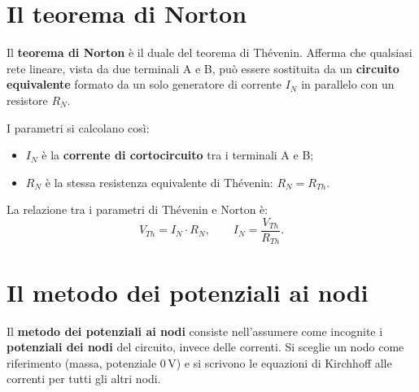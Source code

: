 \section{Il teorema di Norton}

\begin{concetto}
Il \textbf{teorema di Norton} è il duale del teorema di Thévenin. Afferma che qualsiasi rete lineare, vista da due terminali A e B, può essere sostituita da un \textbf{circuito equivalente} formato da un solo generatore di corrente \(I_N\) in parallelo con un resistore \(R_N\).
\end{concetto}

I parametri si calcolano così:
\begin{itemize}[leftmargin=1cm]
  \item \(I_N\) è la \textbf{corrente di cortocircuito} tra i terminali A e B;
  \item \(R_N\) è la stessa resistenza equivalente di Thévenin: \(R_N = R_{Th}\).
\end{itemize}

La relazione tra i parametri di Thévenin e Norton è:
\[
V_{Th} = I_N \cdot R_N, \qquad I_N = \frac{V_{Th}}{R_{Th}}.
\]

\begin{center}
\end{center}

\section{Il metodo dei potenziali ai nodi}

\begin{concetto}
Il \textbf{metodo dei potenziali ai nodi} consiste nell'assumere come incognite i \textbf{potenziali dei nodi} del circuito, invece delle correnti. Si sceglie un nodo come riferimento (massa, potenziale \(0\,\text{V}\)) e si scrivono le equazioni di Kirchhoff alle correnti per tutti gli altri nodi.
\end{concetto}

